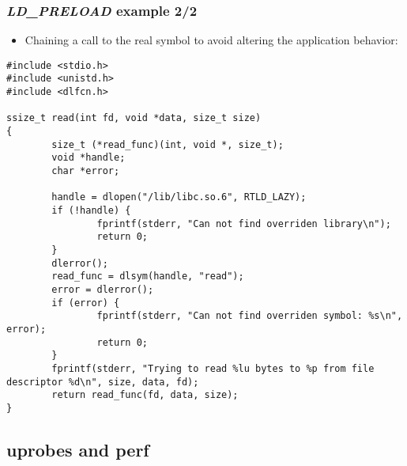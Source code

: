 \begin{frame}[fragile]
  \frametitle{{\em LD\_PRELOAD} example 2/2}
  \begin{itemize}
    \item Chaining a call to the real symbol to avoid altering the
	    application behavior:
  \end{itemize}
  \begin{block}{}
    \begin{verbatim}
#include <stdio.h>
#include <unistd.h>
#include <dlfcn.h>

ssize_t read(int fd, void *data, size_t size)
{
        size_t (*read_func)(int, void *, size_t);
        void *handle;
        char *error;

        handle = dlopen("/lib/libc.so.6", RTLD_LAZY);
        if (!handle) {
                fprintf(stderr, "Can not find overriden library\n");
                return 0;
        }
        dlerror();
        read_func = dlsym(handle, "read");
        error = dlerror();
        if (error) {
                fprintf(stderr, "Can not find overriden symbol: %s\n", error);
                return 0;
        }
        fprintf(stderr, "Trying to read %lu bytes to %p from file descriptor %d\n", size, data, fd);
        return read_func(fd, data, size);
}

    \end{verbatim}
  \end{block}
\end{frame}

\subsection{uprobes and perf}

